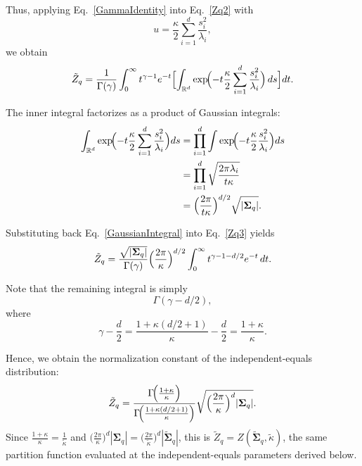 \documentclass[twoside,11pt]{article}
\renewenvironment{proof}{\par\noindent{\bf Proof\ }}{\hfill\BlackBox\par\vspace{2mm}}
\begin{document}
\begin{proof}
Thus, applying Eq.~\eqref{GammaIdentity} into Eq.~\eqref{Zq2} with
\[
u = \frac{\kappa}{2}\sum_{i=1}^d \frac{s_i^2}{\lambda_i},
\]
we obtain
\begin{equation}\label{Zq3}
\tilde Z_q
=\frac{1}{\Gamma(\gamma)}\int_0^\infty
t^{\gamma-1} e^{-t}\Bigl[\int_{\mathbb{R}^d}
\exp\!\Bigl(-t\frac{\kappa}{2}
\sum_{i=1}^d \frac{s_i^2}{\lambda_i}\Bigr)\, ds
\Bigr]dt.
\end{equation}

The inner integral factorizes as a product of Gaussian integrals:
\begin{equation}\label{GaussianIntegral}
\begin{aligned}
\int_{\mathbb{R}^d}\exp\!\Bigl(-t\frac{\kappa}{2}
\sum_{i=1}^d \frac{s_i^2}{\lambda_i}
\Bigr)ds
&=
\prod_{i=1}^d\int\exp\!\Bigl(-t\frac{\kappa}{2}
\frac{s_i^2}{\lambda_i}\Bigr)ds\\
&=
\prod_{i=1}^d\sqrt{\frac{2\pi\lambda_i}{t\kappa}
}\\
&=
\Bigl(\frac{2\pi}{t\kappa}\Bigr)^{d/2}
\sqrt{|\boldsymbol{\Sigma}_q|}.
\end{aligned}
\end{equation}

Substituting back Eq.~\eqref{GaussianIntegral} into Eq.~\eqref{Zq3} yields
\[
\tilde Z_q
=\frac{\sqrt{|\boldsymbol{\Sigma}_q|}}
{\Gamma(\gamma)}\Bigl(\frac{2\pi}{\kappa}
\Bigr)^{d/2}\int_0^\infty
t^{\gamma-1-d/2}e^{-t}\, dt.
\]

Note that the remaining integral is simply
\[
\Gamma(\gamma-d/2),
\]
where
\[
\gamma-\frac{d}{2}
=\frac{1+\kappa(d/2+1)}{\kappa}-\frac{d}{2}
=\frac{1+\kappa}{\kappa}.
\]

Hence, we obtain the normalization constant of the independent-equals distribution:
\begin{equation}\label{Q_partition_function}
\tilde Z_q
=
\frac{
\Gamma\!\Bigl(\frac{1+\kappa}{\kappa}\Bigr)
}{
\Gamma\!\Bigl(\frac{1+\kappa(d/2+1)}{\kappa}\Bigr)
}
\sqrt{\Bigl(\frac{2\pi}{\kappa}\Bigr)^d|\boldsymbol{\Sigma}_q|
}.
\end{equation}
Since $\frac{1+\kappa}{\kappa}=\frac{1}{\tilde\kappa}$ and $\bigl(\frac{2\pi}{\kappa}\bigr)^{d}|\boldsymbol{\Sigma}_q|=\bigl(\frac{2\pi}{\tilde\kappa}\bigr)^{d}|\widetilde{\boldsymbol{\Sigma}}_q|$, this is $\tilde Z_q=Z(\widetilde{\boldsymbol{\Sigma}}_q,\tilde\kappa)$, the same partition function evaluated at the independent-equals parameters derived below.


\end{proof}
\end{document}

